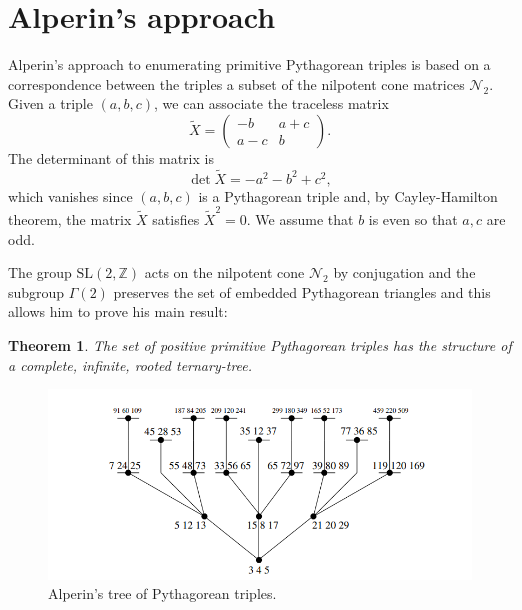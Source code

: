\documentclass[12pt,a4paper]{amsart}
\newtheorem{thm}{Theorem}
\def\g2{\Gamma(2)}
\def\ZZ{\mathbb{Z}}
\def\slz{\mathrm{SL}(2, \ZZ)}
\begin{document}
\section{Alperin's approach}


Alperin's approach \cite{alperin} to enumerating primitive Pythagorean triples is based on a
correspondence between the triples a subset of the nilpotent cone  matrices $\mathcal{N}_2$. 
Given a triple $(a,b,c)$, we can associate the traceless matrix
\[\tilde{X} = \begin{pmatrix} -b & a+c \\ a-c & b \end{pmatrix}.\]
The determinant of this matrix is 
$$ \det \tilde{X} = -a^2 - b^2 + c^2 ,$$
which vanishes since $(a,b,c)$ is a Pythagorean triple
and, by Cayley-Hamilton theorem, the matrix $\tilde{X}$ satisfies $\tilde{X}^2 = 0$.
We assume that $b$ is even so that $a,c$ are odd.

The group $\slz$ acts on the nilpotent cone $\mathcal{N}_2$ by
conjugation and the subgroup $\g2$ preserves the set of
embedded Pythagorean triangles and this allows him to prove his main result:

\begin{thm}
	The set of positive primitive Pythagorean triples has the structure of a
complete, infinite, rooted ternary-tree.
\end{thm}


\begin{figure}[hb]
\begin{center}
\includegraphics[scale=.5]{alperin_tree.png} 
\end{center}
\caption{Alperin's tree of Pythagorean triples.}
\label{farey diagram}
\end{figure}
\end{document}

